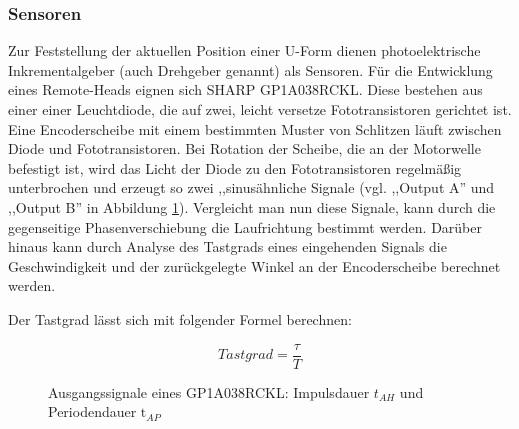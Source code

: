 \documentclass[a4paper, 12pt, bibtotocnumbered, liststotocnumbered]{scrartcl}
\begin{document}
	\subsubsection{Sensoren}
	Zur Feststellung der aktuellen Position einer U-Form dienen photoelektrische Inkrementalgeber (auch Drehgeber genannt) als Sensoren. Für die Entwicklung eines Remote-Heads eignen sich SHARP GP1A038RCKL\cite{inkrementalgeber}. Diese bestehen aus einer einer Leuchtdiode, die auf zwei, leicht versetze Fototransistoren gerichtet ist. Eine Encoderscheibe mit einem bestimmten Muster von Schlitzen läuft zwischen Diode und Fototransistoren. Bei Rotation der Scheibe, die an der Motorwelle befestigt ist, wird das Licht der Diode zu den Fototransistoren regelmäßig unterbrochen und erzeugt so zwei ,,sinusähnliche Signale\cite{wikipedia-inkrementalgeber} (vgl. ,,Output A'' und ,,Output B'' in Abbildung \ref{GP1A038RCKL-AOutBOut}). Vergleicht man nun diese Signale, kann durch die gegenseitige Phasenverschiebung die Laufrichtung bestimmt werden. Darüber hinaus kann durch Analyse des Tastgrads\cite{wikipedia-tastgrad} eines eingehenden Signals die Geschwindigkeit und der zurückgelegte Winkel an der Encoderscheibe berechnet werden.

	Der Tastgrad lässt sich mit folgender Formel berechnen:

	\begin{equation}
		Tastgrad = \frac{\tau}{T}
	\end{equation}

	\begin{figure}[htb]
		\centering
		\hfill
		\caption[Quelle siehe \cite{sharp}]{Ausgangssignale eines GP1A038RCKL: Impulsdauer $\text{}t_{AH}$ und Periodendauer $\text{t}_{AP}$}
		\label{GP1A038RCKL-AOutBOut}
	\end{figure}
\end{document}

